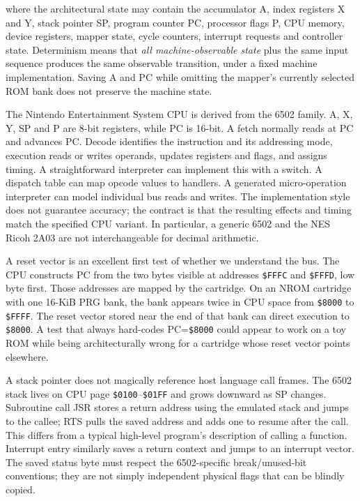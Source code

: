 where the architectural state may contain the accumulator A, index registers X and Y, stack pointer SP, program counter PC, processor flags P, CPU memory, device registers, mapper state, cycle counters, interrupt requests and controller state. Determinism means that \emph{all machine-observable state} plus the same input sequence produces the same observable transition, under a fixed machine implementation. Saving A and PC while omitting the mapper's currently selected ROM bank does not preserve the machine state.

The Nintendo Entertainment System CPU is derived from the 6502 family. A, X, Y, SP and P are 8-bit registers, while PC is 16-bit. A fetch normally reads at PC and advances PC. Decode identifies the instruction and its addressing mode, execution reads or writes operands, updates registers and flags, and assigns timing. A straightforward interpreter can implement this with a switch. A dispatch table can map opcode values to handlers. A generated micro-operation interpreter can model individual bus reads and writes. The implementation style does not guarantee accuracy; the contract is that the resulting effects and timing match the specified CPU variant. In particular, a generic 6502 and the NES Ricoh 2A03 are not interchangeable for decimal arithmetic.

A reset vector is an excellent first test of whether we understand the bus. The CPU constructs PC from the two bytes visible at addresses \texttt{\$FFFC} and \texttt{\$FFFD}, low byte first. Those addresses are mapped by the cartridge. On an NROM cartridge with one 16-KiB PRG bank, the bank appears twice in CPU space from \texttt{\$8000} to \texttt{\$FFFF}. The reset vector stored near the end of that bank can direct execution to \texttt{\$8000}. A test that always hard-codes PC=\texttt{\$8000} could appear to work on a toy ROM while being architecturally wrong for a cartridge whose reset vector points elsewhere.

A stack pointer does not magically reference host language call frames. The 6502 stack lives on CPU page \texttt{\$0100}--\texttt{\$01FF} and grows downward as SP changes. Subroutine call JSR stores a return address using the emulated stack and jumps to the callee; RTS pulls the saved address and adds one to resume after the call. This differs from a typical high-level program's description of calling a function. Interrupt entry similarly saves a return context and jumps to an interrupt vector. The saved status byte must respect the 6502-specific break/unused-bit conventions; they are not simply independent physical flags that can be blindly copied.

